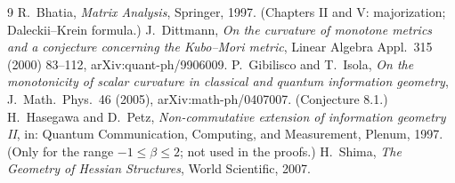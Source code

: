 \documentclass[11pt]{amsart}
\theoremstyle{definition}
\numberwithin{equation}{section}
\begin{document}
\begin{thebibliography}{9}
 R.~Bhatia, \emph{Matrix Analysis}, Springer, 1997. (Chapters II and V: majorization; Daleckii--Krein formula.)
 J.~Dittmann, \emph{On the curvature of monotone metrics and a conjecture concerning the Kubo--Mori metric}, Linear Algebra Appl.\ 315 (2000) 83--112, arXiv:quant-ph/9906009.
 P.~Gibilisco and T.~Isola, \emph{On the monotonicity of scalar curvature in classical and quantum information geometry}, J.\ Math.\ Phys.\ 46 (2005), arXiv:math-ph/0407007. (Conjecture 8.1.)
 H.~Hasegawa and D.~Petz, \emph{Non-commutative extension of information geometry II}, in: Quantum Communication, Computing, and Measurement, Plenum, 1997. (Only for the range $-1\le\beta\le2$; not used in the proofs.)
 H.~Shima, \emph{The Geometry of Hessian Structures}, World Scientific, 2007.
\end{thebibliography}
\end{document}
